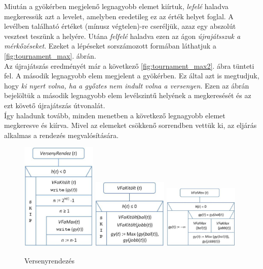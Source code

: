 \documentclass[12pt,margin=0px]{article}
\begin{document}
    \noindent Miután a gyökérben megjelenő legnagyobb elemet kiírtuk, \emph{lefelé} haladva megkeressük azt a levelet, amelyben eredetileg ez az érték helyet foglal. A levélben található értéket (mínusz végtelen)-re cseréljük, azaz egy abszolút vesztest teszünk a helyére. Utána \emph{felfelé} haladva ezen az ágon \emph{újrajátsszuk a mérkőzéseket}. Ezeket a lépéseket sorszámozott formában láthatjuk a \ref{fig:tournament_max}. ábrán.\\

    \noindent Az újrajátszás eredményét már a következő \ref{fig:tournament_max2}. ábra tünteti fel. A második legnagyobb elem megjelent a gyökérben. Ez által azt is megtudjuk, hogy \emph{ki nyert volna, ha a győztes nem indult volna a versenyen}. Ezen az ábrán bejelöltük a második legnagyobb elem levélszintű helyének a megkeresését és az ezt követő újrajátszás útvonalát.\\

    \noindent Így haladunk tovább, minden menetben a következő legnagyobb elemet megkeresve és kiírva. Mivel az elemeket csökkenő sorrendben vettük ki, az eljárás alkalmas a rendezés megvalósítására.

	\begin{figure}[H]
		\centering
		\includegraphics[width=0.32\textwidth]{img/tournamentsort.png}
		\includegraphics[width=0.32\textwidth]{img/vtree_fill.png}
		\includegraphics[width=0.32\textwidth]{img/vtree_max.png}
		\caption{Versenyrendezés}
	\end{figure}
	
\end{document}

